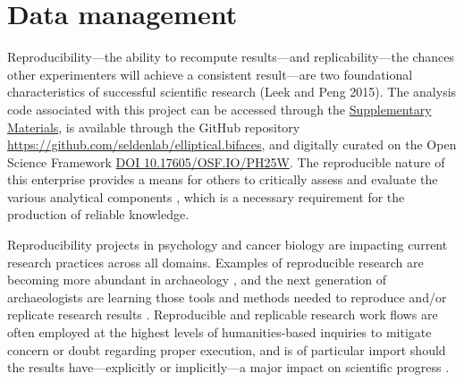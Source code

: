 \documentclass[]{interact}
\theoremstyle{plain}%
\theoremstyle{definition}
\theoremstyle{remark}
\begin{document}
\hypertarget{data-management}{%
\section{Data management}\label{data-management}}

Reproducibility---the ability to recompute results---and
replicability---the chances other experimenters will achieve a
consistent result---are two foundational characteristics of successful
scientific research (Leek and Peng 2015). The analysis code associated
with this project can be accessed through the
\href{https://seldenlab.github.io/elliptical.bifaces/}{Supplementary
Materials}, is available through the GitHub repository
\url{https://github.com/seldenlab/elliptical.bifaces}, and digitally
curated on the Open Science Framework \href{https://osf.io/ph25w/}{DOI
10.17605/OSF.IO/PH25W}. The reproducible nature of this enterprise
provides a means for others to critically assess and evaluate the
various analytical components \citep{RN7434,RN7435,RN7427}, which is a
necessary requirement for the production of reliable knowledge.

Reproducibility projects in psychology and cancer biology are impacting
current research practices across all domains. Examples of reproducible
research are becoming more abundant in archaeology
\citep{RN9022,RN7818,RN10578,RN10576,RN8510,RN11097}, and the next
generation of archaeologists are learning those tools and methods needed
to reproduce and/or replicate research results \citep{RN10579}.
Reproducible and replicable research work flows are often employed at
the highest levels of humanities-based inquiries to mitigate concern or
doubt regarding proper execution, and is of particular import should the
results have---explicitly or implicitly---a major impact on scientific
progress \citep{RN10580}.






\end{document}
